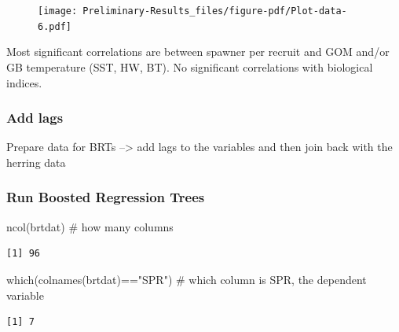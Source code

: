 \documentclass[
  letterpaper,
  DIV=11,
  numbers=noendperiod]{scrartcl}
\newenvironment{Shaded}{\begin{snugshade}}{\end{snugshade}}
\newcommand{\CommentTok}[1]{\textcolor[rgb]{0.37,0.37,0.37}{#1}}
\newcommand{\FunctionTok}[1]{\textcolor[rgb]{0.28,0.35,0.67}{#1}}
\newcommand{\NormalTok}[1]{\textcolor[rgb]{0.00,0.23,0.31}{#1}}
\newcommand{\SpecialCharTok}[1]{\textcolor[rgb]{0.37,0.37,0.37}{#1}}
\newcommand{\StringTok}[1]{\textcolor[rgb]{0.13,0.47,0.30}{#1}}
\begin{document}
\begin{figure}[H]

{\centering \texttt{[image: Preliminary-Results\_files/figure-pdf/Plot-data-6.pdf]}

}

\end{figure}

Most significant correlations are between spawner per recruit and GOM
and/or GB temperature (SST, HW, BT). No significant correlations with
biological indices.

\hypertarget{add-lags}{%
\subsubsection{Add lags}\label{add-lags}}

Prepare data for BRTs --\textgreater{} add lags to the variables and
then join back with the herring data

\hypertarget{run-boosted-regression-trees}{%
\subsubsection{Run Boosted Regression
Trees}\label{run-boosted-regression-trees}}

\begin{Shaded}
\begin{Highlighting}[]
\FunctionTok{ncol}\NormalTok{(brtdat) }\CommentTok{\# how many columns}
\end{Highlighting}
\end{Shaded}

\begin{verbatim}
[1] 96
\end{verbatim}

\begin{Shaded}
\begin{Highlighting}[]
\FunctionTok{which}\NormalTok{(}\FunctionTok{colnames}\NormalTok{(brtdat)}\SpecialCharTok{==}\StringTok{"SPR"}\NormalTok{) }\CommentTok{\# which column is SPR, the dependent variable}
\end{Highlighting}
\end{Shaded}

\begin{verbatim}
[1] 7
\end{verbatim}
\end{document}
